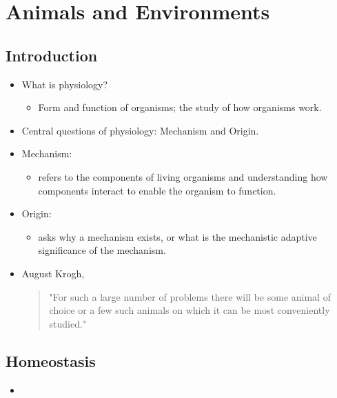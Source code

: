 \documentclass[12pt,a4paper]{article}
\begin{document}
\tableofcontents
\cleardoublepage
\fancyhead{}

\clearpage
{}
\clearpage
\section{Animals and Environments}
\subsection{Introduction}
\begin{itemize}
    \item What is physiology?
        \begin{itemize}
            \item Form and function of organisms; the study of how organisms work.
        \end{itemize}
    \item Central questions of physiology: {\color{o-Sun}Mechanism} and {\color{o-Sun}Origin}.
    \item Mechanism:
        \begin{itemize}
            \item refers to the {\color{o-Sun}components} of living organisms and understanding {\color{o-Sun}how} components interact to enable the organism to function.
        \end{itemize}
    \item Origin:
        \begin{itemize}
            \item asks why a mechanism exists, or {\color{o-Sun}what} is the mechanistic {\color{o-Sun}adaptive significance} of the mechanism.
        \end{itemize}
    \item August Krogh, \begin{quote}
        "For such a large number of problems there will be some animal of choice or a few such animals on which it can be most conveniently studied."
    \end{quote}
\end{itemize}

\subsection{Homeostasis}
\begin{itemize}
    \item 
\end{itemize}
\end{document}
